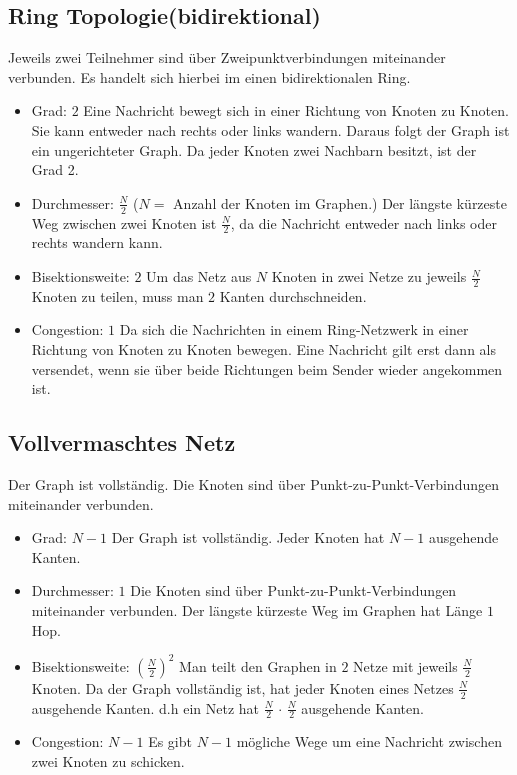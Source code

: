 \subsection{Ring Topologie(bidirektional)}
 Jeweils zwei Teilnehmer sind über Zweipunktverbindungen miteinander verbunden.
 Es handelt sich hierbei im einen bidirektionalen Ring.
\begin{itemize}
  \item Grad: $2$
  \newline Eine Nachricht bewegt sich in einer Richtung von Knoten zu Knoten.
  Sie kann entweder nach rechts oder links wandern. Daraus folgt der Graph ist ein ungerichteter Graph. Da jeder Knoten zwei Nachbarn besitzt, ist der Grad 2.
  \item Durchmesser: $\frac{N}{2}$ ($N =$ Anzahl der Knoten im Graphen.)
   \newline Der längste kürzeste Weg zwischen zwei Knoten ist $\frac{N}{2}$, da
   die Nachricht entweder nach links oder rechts wandern kann.
  \item Bisektionsweite: $2$
  \newline  Um das Netz aus $N$ Knoten in zwei Netze zu jeweils $\frac{N}{2}$
  Knoten zu teilen, muss man $2$ Kanten durchschneiden.
  \item Congestion: $1$
  \newline Da sich die Nachrichten in einem Ring-Netzwerk in einer Richtung von
  Knoten zu Knoten bewegen. Eine Nachricht gilt erst dann als versendet, wenn
  sie über beide Richtungen beim Sender wieder angekommen ist.
\end{itemize}

\subsection{Vollvermaschtes Netz}
Der Graph ist vollständig. Die Knoten sind über Punkt-zu-Punkt-Verbindungen
miteinander verbunden.
\begin{itemize}
  \item Grad: $N-1$
  \newline Der Graph ist vollständig. Jeder Knoten hat $N-1$ ausgehende Kanten.
  \item Durchmesser: $1$
   \newline Die Knoten sind über Punkt-zu-Punkt-Verbindungen miteinander
   verbunden. Der längste kürzeste Weg im Graphen hat Länge $1$ Hop.
  \item Bisektionsweite: $ \left( \frac{N}{2}\right)^2$
  \newline Man teilt den Graphen in $2$ Netze mit jeweils $\frac{N}{2}$ Knoten.
  Da der Graph vollständig ist, hat jeder Knoten eines Netzes  $\frac{N}{2}$
  ausgehende Kanten. d.h ein Netz hat $\frac{N}{2} \, \cdot \, \frac{N}{2}$
  ausgehende Kanten.
  \item Congestion: $N-1$
  \newline Es gibt $N-1$ mögliche Wege um eine Nachricht zwischen zwei Knoten zu
  schicken.
\end{itemize}


